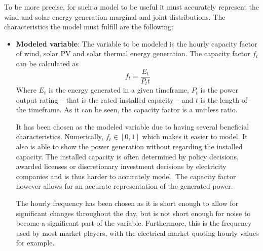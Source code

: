 To be more precise, for such a model to be useful it must accurately represent the wind and solar energy generation marginal and joint distributions. The characteristics the model must fulfill are the following:
\begin{itemize}
    \item \textbf{Modeled variable}: The variable to be modeled is the hourly capacity factor of wind, solar PV and solar thermal energy generation. The capacity factor $f_t$ can be calculated as 
    \begin{equation}
        \label{eq:capacity-factor}
        f_t=\frac{E_t}{P_t t}
    \end{equation}
    Where $E_t$ is the energy generated in a given timeframe, $P_t$ is the power output rating -- that is the rated installed capacity -- and $t$ is the length of the timeframe. As it can be seen, the capacity factor is a unitless ratio. 
    
    It has been chosen as the modeled variable due to having several beneficial characteristics. Numerically, $f_t \in \left[0,1\right]$ which makes it easier to model. It also is able to show the power generation without regarding the installed capacity. The installed capacity is often determined by policy decisions, awarded licenses or discretionary investment decisions by electricity companies and is thus harder to accurately model. The capacity factor however allows for an accurate representation of the generated power. 

    The hourly frequency has been chosen as it is short enough to allow for significant changes throughout the day, but is not short enough for noise to become a significant part of the variable. Furthermore, this is the frequency used by most market players, with the electrical market quoting hourly values for example. 


\end{itemize}
